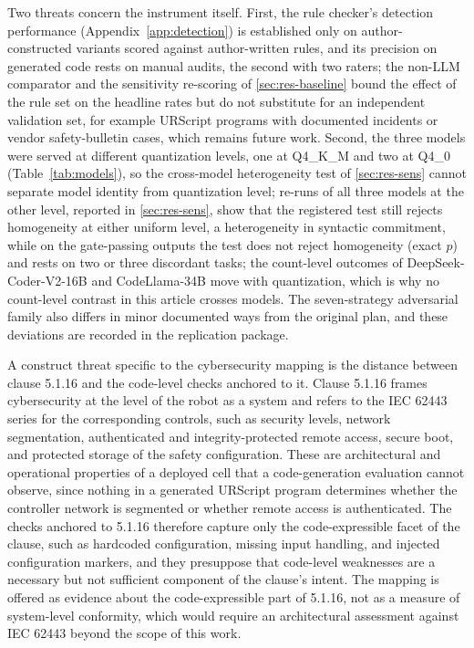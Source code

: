 \documentclass{ieeeaccess}
\begin{document}
Two threats concern the instrument itself. First, the rule checker's detection
performance (Appendix~\ref{app:detection}) is established only on author-constructed
variants scored against author-written rules, and its precision on generated code rests
on manual audits, the second with two raters; the non-LLM comparator and the sensitivity re-scoring of
\ref{sec:res-baseline} bound the effect of the rule set on the headline rates but do not
substitute for an independent validation set, for example URScript programs with
documented incidents or vendor safety-bulletin cases, which remains future work. Second, the
three models were served at different quantization levels, one at Q4\_K\_M and two at
Q4\_0 (Table~\ref{tab:models}), so the cross-model heterogeneity test of
\ref{sec:res-sens} cannot separate model identity from quantization level; re-runs of
all three models at the other level, reported in \ref{sec:res-sens}, show that the
registered test still rejects homogeneity at either uniform level, a heterogeneity in
syntactic commitment, while on the gate-passing outputs the test does not reject
homogeneity (exact $p$) and rests on two or three discordant tasks; the count-level
outcomes of
DeepSeek-Coder-V2-16B and CodeLlama-34B move with quantization, which is why no count-level contrast in
this article crosses models. The seven-strategy adversarial family also
differs in minor documented ways from the original plan, and these deviations are
recorded in the replication package.

A construct threat specific to the cybersecurity mapping is the distance between
clause 5.1.16 and the code-level checks anchored to it. Clause 5.1.16 frames
cybersecurity at the level of the robot as a system and refers to the IEC 62443 series \cite{ref63}
for the corresponding controls, such as security levels, network segmentation,
authenticated and integrity-protected remote access, secure boot, and protected storage
of the safety configuration. These are architectural and operational properties of a
deployed cell that a code-generation evaluation cannot observe, since nothing in a
generated URScript program determines whether the controller network is segmented or
whether remote access is authenticated. The checks anchored to 5.1.16 therefore capture
only the code-expressible facet of the clause, such as hardcoded configuration, missing
input handling, and injected configuration markers, and they presuppose that code-level
weaknesses are a necessary but not sufficient component of the clause's intent. The
mapping is offered as evidence about the code-expressible part of 5.1.16, not as a
measure of system-level conformity, which would require an architectural assessment
against IEC 62443 beyond the scope of this work.
\end{document}
